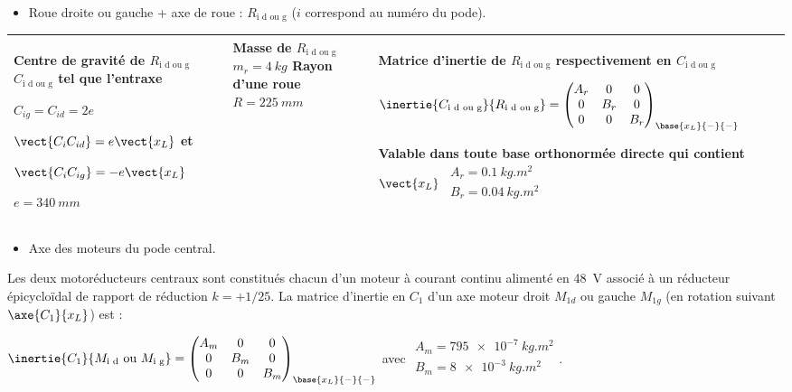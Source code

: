 \begin{itemize}
\item Roue droite ou gauche + axe de roue : $R_{\text{i d ou g}}$ ($i$ correspond au numéro du pode).
\end{itemize}

\begin{center}
\begin{tabular}{|p{4cm}|p{4cm}|p{8cm}|}
\hline
Centre de gravité de $R_{\text{i d ou g}}$ $C_{\text{i d ou g}}$ tel que l'entraxe

$C_{ig}=C_{id}=2e$ 

$\vect{C_i C_{id}}=e\vect{x_L}$ et 

$\vect{C_i C_{ig}}=-e\vect{x_L}$ 

$e=\SI{340}{mm}$ 
&
Masse de $R_{\text{i d ou g}}$ $m_r = \SI{4}{kg}$
Rayon d'une roue $R=\SI{225}{mm}$
& 
Matrice d'inertie de $R_{\text{i d ou g}}$ respectivement en  $C_{\text{i d ou g}}$ 

$\inertie{C_{\text{i d ou g}}}{R_{\text{i d ou g}}}=
\begin{pmatrix} 
A_r & 0 & 0 \\ 0 & B_r & 0 \\ 0 & 0 & B_r 
\end{pmatrix}_{\base{x_L}{-}{-}}$

Valable dans toute base orthonormée directe qui contient $\vect{x_L}$
$
\begin{array}{l}
A_r =\SI{0,1}{kg.m^2} \\
B_r =\SI{0,04}{kg.m^2} \\
\end{array}$\\
\hline
\end{tabular}
\end{center}

\begin{itemize}
\item Axe des moteurs du pode central.
\end{itemize}

Les deux motoréducteurs centraux sont constitués chacun d’un moteur à courant continu alimenté en \SI{48}{V} associé à
un réducteur épicycloïdal de rapport de réduction $k = +1/ 25$. La matrice d’inertie en $C_1$ d’un axe moteur droit $M_{1d}$ ou
gauche $M_{1g}$  (en rotation suivant $\axe{C_1}{x_L}$) est :

$\inertie{C_1}{M_{\text{i d}} \text{ ou } M_{\text{i g}}}=
\begin{pmatrix} 
A_m & 0 & 0 \\ 0 & B_m & 0 \\ 0 & 0 & B_m 
\end{pmatrix}_{\base{x_L}{-}{-}}$
avec 
$\begin{array}{l}
A_m =\SI{795e-7}{kg.m^2} \\
B_m =\SI{8e-3}{kg.m^2} \\
\end{array}$.

